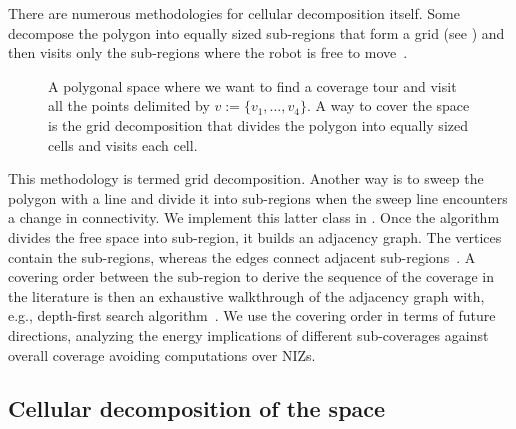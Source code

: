 There are numerous methodologies for cellular decomposition itself. Some decompose the polygon into equally sized sub-regions that form a grid (see ) and then visits only the sub-regions where the robot is free to move~\citep{galceran2013survey}. 
\begin{figure}[h!]
  \centering
  \selectfont
  
  \caption[Grid decomposition]{A polygonal space where we want to find a coverage tour and visit all the points delimited by $v:=\{v_1,\dots,v_4\}$. A way to cover the space is the grid decomposition that divides the polygon into equally sized cells and visits each cell.}
  \label{fig:gride}
\end{figure}
This methodology is termed grid decomposition. Another way is to sweep the polygon with a line and divide it into sub-regions when the sweep line encounters a change in connectivity. We implement this latter class in . Once the algorithm divides the free space into sub-region, it builds an adjacency graph. The vertices contain the sub-regions, whereas the edges connect adjacent sub-regions~\citep{choset2005principles}. A covering order between the sub-region to derive the sequence of the coverage in the literature is then an exhaustive walkthrough of the adjacency graph with, e.g., depth-first search algorithm~\citep{choset2005principles}. We use the covering order in terms of future directions, analyzing the energy implications of different sub-coverages against overall coverage avoiding computations over NIZs.

\subsection{Cellular decomposition of the space}
\label{sec:cell-deco}

